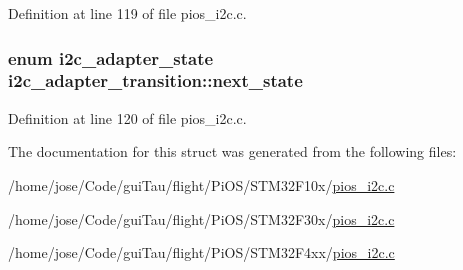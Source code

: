 Definition at line 119 of file pios\-\_\-i2c.\-c.

\hypertarget{structi2c__adapter__transition_aeb924ed73ea6faa20f16115e325c9125}{
\subsubsection[{next\-\_\-state}]{\setlength{\rightskip}{0pt plus 5cm}enum {\bf i2c\-\_\-adapter\-\_\-state} i2c\-\_\-adapter\-\_\-transition\-::next\-\_\-state}}\label{structi2c__adapter__transition_aeb924ed73ea6faa20f16115e325c9125}


Definition at line 120 of file pios\-\_\-i2c.\-c.



The documentation for this struct was generated from the following files\-:\begin{DoxyCompactItemize}
\item 
/home/jose/\-Code/gui\-Tau/flight/\-Pi\-O\-S/\-S\-T\-M32\-F10x/\hyperlink{_s_t_m32_f10x_2pios__i2c_8c}{pios\-\_\-i2c.\-c}\item 
/home/jose/\-Code/gui\-Tau/flight/\-Pi\-O\-S/\-S\-T\-M32\-F30x/\hyperlink{_s_t_m32_f30x_2pios__i2c_8c}{pios\-\_\-i2c.\-c}\item 
/home/jose/\-Code/gui\-Tau/flight/\-Pi\-O\-S/\-S\-T\-M32\-F4xx/\hyperlink{_s_t_m32_f4xx_2pios__i2c_8c}{pios\-\_\-i2c.\-c}\end{DoxyCompactItemize}
